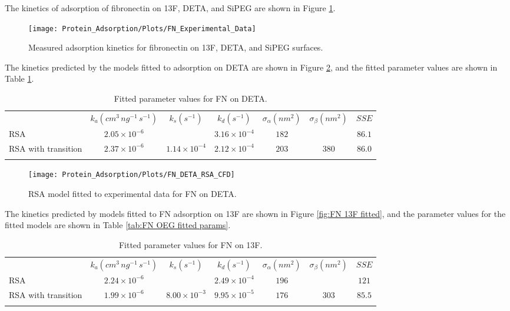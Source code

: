 The kinetics of adsorption of fibronectin on 13F, DETA, and SiPEG
are shown in Figure \ref{fig:FN experiments}.%
\begin{figure}
\texttt{[image: Protein\_Adsorption/Plots/FN\_Experimental\_Data]}

\caption{\label{fig:FN experiments}Measured adsorption kinetics for fibronectin
on 13F, DETA, and SiPEG surfaces.}


%
\end{figure}
 The kinetics predicted by the models fitted to adsorption on DETA
are shown in Figure \ref{fig:FN DETA fitted}, and the fitted parameter
values are shown in Table \ref{tab:FN on DETA params}.%
\begin{table}
\caption{\label{tab:FN on DETA params}Fitted parameter values for FN on DETA.}
\begin{tabular}{>{\raggedright}p{0.75in}cccccc}
 & $k_{a}\left(cm^{3}\, ng^{-1}\, s^{-1}\right)$ & $k_{s}\left(s^{-1}\right)$ & $k_{d}\left(s^{-1}\right)$ & $\sigma_{\alpha}\left(nm^{2}\right)$ & $\sigma_{\beta}\left(nm^{2}\right)$ & $SSE$\tabularnewline[\doublerulesep]
\cline{2-7} 
\noalign{\vskip\doublerulesep}
RSA & $2.05\times10^{-6}$ &  & $3.16\times10^{-4}$ & $182$ &  & $86.1$\tabularnewline
\noalign{\vskip\doublerulesep}
RSA with transition & $2.37\times10^{-6}$ & $1.14\times10^{-4}$ & $2.12\times10^{-4}$ & $203$ & $380$ & $86.0$\tabularnewline
\noalign{\vskip\doublerulesep}
\end{tabular}%
\end{table}
%
\begin{figure}
\texttt{[image: Protein\_Adsorption/Plots/FN\_DETA\_RSA\_CFD]}

\caption{\label{fig:FN DETA fitted}RSA model fitted to experimental data for
FN on DETA.}


%
\end{figure}
 The kinetics predicted by models fitted to FN adsorption on 13F are
shown in Figure \ref{fig:FN 13F fitted}, and the parameter values
for the fitted models are shown in Table \ref{tab:FN OEG fitted params}.%
\begin{table}
\caption{\label{tab:FN on 13F}Fitted parameter values for FN on 13F.}
\begin{tabular}{>{\raggedright}p{0.75in}cccccc}
 & $k_{a}\left(cm^{3}\, ng^{-1}\, s^{-1}\right)$ & $k_{s}\left(s^{-1}\right)$ & $k_{d}\left(s^{-1}\right)$ & $\sigma_{\alpha}\left(nm^{2}\right)$ & $\sigma_{\beta}\left(nm^{2}\right)$ & $SSE$\tabularnewline[\doublerulesep]
\cline{2-7} 
\noalign{\vskip\doublerulesep}
RSA & $2.24\times10^{-6}$ &  & $2.49\times10^{-4}$ & $196$ &  & $121$\tabularnewline
\noalign{\vskip\doublerulesep}
RSA with transition & $1.99\times10^{-6}$ & $8.00\times10^{-3}$ & $9.95\times10^{-5}$ & $176$ & $303$ & $85.5$\tabularnewline
\noalign{\vskip\doublerulesep}
\end{tabular}%
\end{table}
